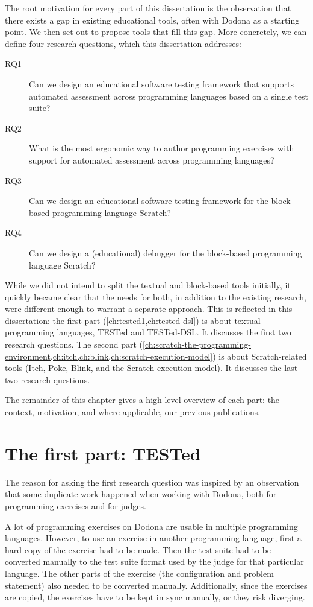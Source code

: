 \documentclass[../main]{subfiles}
\begin{document}
The root motivation for every part of this dissertation is the observation that there exists a gap in existing educational tools, often with Dodona as a starting point.
We then set out to propose tools that fill this gap.
More concretely, we can define four research questions, which this dissertation addresses:

\begin{description}
    \item[RQ1] Can we design an educational software testing framework that supports automated assessment across programming languages based on a single test suite?
    \item[RQ2] What is the most ergonomic way to author programming exercises with support for automated assessment across programming languages?
    \item[RQ3] Can we design an educational software testing framework for the block-based programming language Scratch?
    \item[RQ4] Can we design a (educational) debugger for the block-based programming language Scratch?
\end{description}

While we did not intend to split the textual and block-based tools initially, it quickly became clear that the needs for both, in addition to the existing research, were different enough to warrant a separate approach.
This is reflected in this dissertation: the first part (\cref{ch:tested1,ch:tested-dsl}) is about textual programming languages, TESTed and TESTed-DSL\@.
It discusses the first two research questions.
The second part (\cref{ch:scratch-the-programming-environment,ch:itch,ch:blink,ch:scratch-execution-model}) is about Scratch-related tools (Itch, Poke, Blink, and the Scratch execution model).
It discusses the last two research questions.

The remainder of this chapter gives a high-level overview of each part: the context, motivation, and where applicable, our previous publications.

\section{The first part: TESTed}\label{sec:intro-tested}

The reason for asking the first research question was inspired by an observation that some duplicate work happened when working with Dodona, both for programming exercises and for judges.

A lot of programming exercises on Dodona are usable in multiple programming languages.
However, to use an exercise in another programming language, first a hard copy of the exercise had to be made.
Then the test suite had to be converted manually to the test suite format used by the judge for that particular language.
The other parts of the exercise (the configuration and problem statement) also needed to be converted manually.
Additionally, since the exercises are copied, the exercises have to be kept in sync manually, or they risk diverging.
\end{document}
